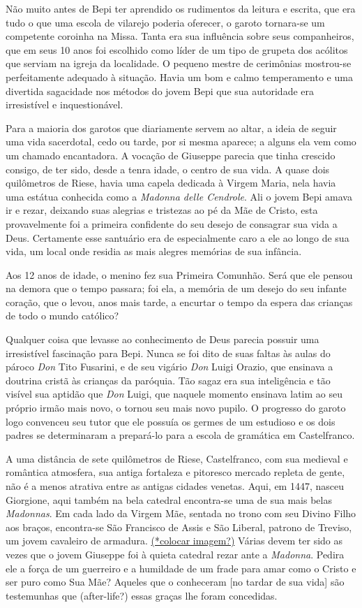 \documentclass[12pt,a4paper,oneside]{book}
\begin{document}
Não muito antes de Bepi ter aprendido os rudimentos da leitura e escrita, que era tudo o que uma escola de vilarejo poderia oferecer, o garoto tornara-se um competente coroinha na Missa. Tanta era sua influência sobre seus companheiros, que em seus 10 anos foi escolhido como líder de um tipo de grupeta dos acólitos que serviam na igreja da localidade. O pequeno mestre de cerimônias mostrou-se perfeitamente adequado à situação. Havia um bom e calmo temperamento e uma divertida sagacidade nos métodos do jovem Bepi
 que sua autoridade era irresistível e inquestionável.

\quad Para a maioria dos garotos que diariamente servem ao altar, a ideia de seguir uma vida sacerdotal, cedo ou tarde, por si mesma aparece; a alguns ela vem como um chamado encantadora. A vocação de Giuseppe parecia que tinha crescido consigo, de ter sido, desde a tenra idade, o centro de sua vida. A quase dois quilômetros de Riese, havia uma capela dedicada à Virgem Maria, nela havia uma estátua conhecida como a \emph{Madonna delle Cendrole}. Ali o jovem Bepi amava ir e rezar, deixando suas alegrias e tristezas ao pé da Mãe de Cristo, esta provavelmente foi a primeira confidente do seu desejo de consagrar sua vida a Deus. Certamente esse santuário era de especialmente caro a ele ao longo de sua vida, um local onde residia as mais alegres memórias de sua infância.

\quad Aos 12 anos de idade, o menino fez sua Primeira Comunhão. Será que ele pensou na demora que o tempo passara; foi ela, a memória de um desejo do seu infante coração, que o levou, anos mais tarde, a encurtar o tempo da espera das crianças de todo o mundo católico?

\quad Qualquer coisa que levasse ao conhecimento de Deus parecia possuir uma irresistível fascinação para Bepi. Nunca se foi dito de suas faltas às aulas do pároco \emph{Don} Tito Fusarini, e de seu vigário \emph{Don} Luigi Orazio, que ensinava a doutrina cristã às crianças da paróquia. Tão sagaz era sua inteligência e tão visível sua aptidão que \emph{Don} Luigi, que naquele momento ensinava latim ao seu próprio irmão mais novo, o tornou seu mais novo pupilo. O progresso do garoto logo convenceu seu tutor que ele possuía os germes de um estudioso e os dois padres se determinaram a prepará-lo para a escola de gramática em Castelfranco.

A uma distância de sete quilômetros de Riese, Castelfranco, com sua medieval e romântica atmosfera, sua antiga fortaleza e pitoresco mercado repleta de gente, não é a menos atrativa entre as antigas cidades venetas. Aqui, em 1447, nasceu Giorgione, aqui também na bela catedral encontra-se uma de sua mais belas \emph{Madonnas}. Em cada lado da Virgem Mãe, sentada no trono com seu Divino Filho aos braços, encontra-se São Francisco de Assis e São Liberal, patrono de Treviso, um jovem cavaleiro de armadura. \underline{(*colocar imagem?)}  
Várias devem ter sido as vezes que o jovem Giuseppe foi à quieta catedral rezar ante a \emph{Madonna}. Pedira ele a força de um guerreiro e a humildade de um frade para amar como o Cristo e ser puro como Sua Mãe? Aqueles que o conheceram [no tardar de sua vida] são testemunhas que (after-life?) essas graças lhe foram concedidas.
\end{document}

